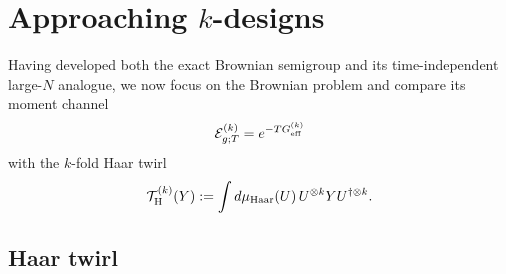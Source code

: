\documentclass{article}
\theoremstyle{definition}
\begin{document}

\section{Approaching $k$-designs}
\label{sec:kdesigns}

Having developed both the exact Brownian semigroup and its time-independent
large-$N$ analogue, we now focus on the Brownian problem and compare its
moment channel
\begin{equation}
    {\cal E}_{g;T}^{(k)}=e^{-TG_{\rm eff}^{(k)}}
\end{equation}
with the $k$-fold Haar twirl
\begin{equation}
    {\cal T}_{\rm H}^{(k)}(Y)
    :=\int d\mu_{\rm Haar}(U)\,
      U^{\otimes k}YU^{\dagger\otimes k}.
\end{equation}

\subsection{Haar twirl}
\end{document}
